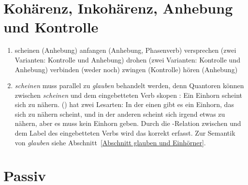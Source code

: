 \section{Kohärenz, Inkohärenz, Anhebung und Kontrolle}

\begin{enumerate}
\item
      \eal
      \ex scheinen (Anhebung)
      \ex anfangen (Anhebung, Phasenverb)
      \ex versprechen (zwei Varianten: Kontrolle und Anhebung)
      \ex drohen (zwei Varianten: Kontrolle und Anhebung)
      \ex verbinden (weder noch)
      \ex zwingen (Kontrolle)
      \ex hören (Anhebung)
      \zl

\item
\eanoraggedright
\oneline{%
\onems{
\ldots \ms{ cat & \ms{%
                     arg-st & \ibox{1} $\oplus$ \sliste{ NP[\type{ldat}]\ind{2} } $\oplus$ \ibox{3}
                     $\oplus$ \sliste{ V[\type{inf}, \textsc{lex}+, \textsc{subj}~\ibox{1},
                       \textsc{comps}~\ibox{3}, \ltop \ibox{4}]} }\\
              cont & \ms{ ltop & \ibox{5}\\
                          ind  & \ibox{6} event } }\\
\rels \liste{ \ms[scheinen]{
                lbl  & \ibox{5}\\
                arg0 & \ibox{6}\\
                arg1 & \ibox{2}\\
                arg2 & \ibox{7} } }\\
hcons \liste{ \ms[qeq]{
               harg & \ibox{7}\\
               larg & \ibox{4} }  }
}
}
\z
\emph{scheinen} muss parallel zu \emph{glauben} behandelt werden, denn Quantoren können zwischen
\emph{scheinen} und dem eingebetteten Verb skopen \citep[202--203]{Kiss95a}:
\ea
Ein Einhorn scheint sich zu nähern.
\z
() hat zwei Lesarten: In der einen gibt es ein Einhorn, das sich zu nähern scheint, und in
der anderen scheint sich irgend etwas zu nähern, aber es muss kein Einhorn geben. Durch die
\qeq-Relation zwischen  und dem Label des eingebetteten Verbs  wird das korrekt
erfasst. Zur Semantik von \emph{glauben} siehe Abschnitt~\ref{Abschnitt glauben und Einhörner}.
\end{enumerate}

\section{Passiv}

